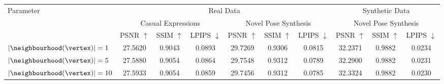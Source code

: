 
\begin{table*}[!t]
  \centering
  \begin{tabular}{lccccccccc}
    \toprule
    \multirow{3}[3]{*}{Parameter}    & \multicolumn{6}{c}{Real Data}          & \multicolumn{3}{c}{Synthetic Data}                                                                                                                                                                                                                                                                            \\
    \cmidrule(lr){2-7}\cmidrule(lr){8-10}
                                     & \multicolumn{3}{c}{Casual Expressions} & \multicolumn{3}{c}{Novel Pose Synthesis} & \multicolumn{3}{c}{Novel Pose Synthesis}                                                                                                                                                                                                                           \\
    \cmidrule(lr){2-4}\cmidrule(lr){5-7}\cmidrule(lr){8-10}
                                     & PSNR $\uparrow$                        & SSIM $\uparrow$                          & LPIPS $\downarrow$                       & PSNR $\uparrow$                    & SSIM $\uparrow$                   & LPIPS $\downarrow$                & PSNR $\uparrow$                    & SSIM $\uparrow$                   & LPIPS $\downarrow$                \\
    \midrule
    $|\neighbourhood(\vertex)| = 1$  & 27.5620                                & 0.9043                                   & 0.0893                                   & 29.7269                            & 0.9306                            & 0.0815                            & 32.2371                            & \cellcolor{secondbestcolor}0.9882 & 0.0234                            \\
    $|\neighbourhood(\vertex)| = 5$  & 27.5880                                & \cellcolor{secondbestcolor}0.9054        & 0.0864                                   & \cellcolor{firstbestcolor}29.7548  & \cellcolor{secondbestcolor}0.9312 & 0.0789                            & 32.2900                            & \cellcolor{secondbestcolor}0.9882 & 0.0231                            \\
    $|\neighbourhood(\vertex)| = 10$ & \cellcolor{secondbestcolor}27.5933     & \cellcolor{secondbestcolor}0.9054        & \cellcolor{secondbestcolor}0.0859        & \cellcolor{secondbestcolor}29.7456 & \cellcolor{secondbestcolor}0.9312 & \cellcolor{secondbestcolor}0.0785 & \cellcolor{secondbestcolor}32.3324 & \cellcolor{secondbestcolor}0.9882 & \cellcolor{secondbestcolor}0.0230 \\

\end{tabular}
\end{table*}
